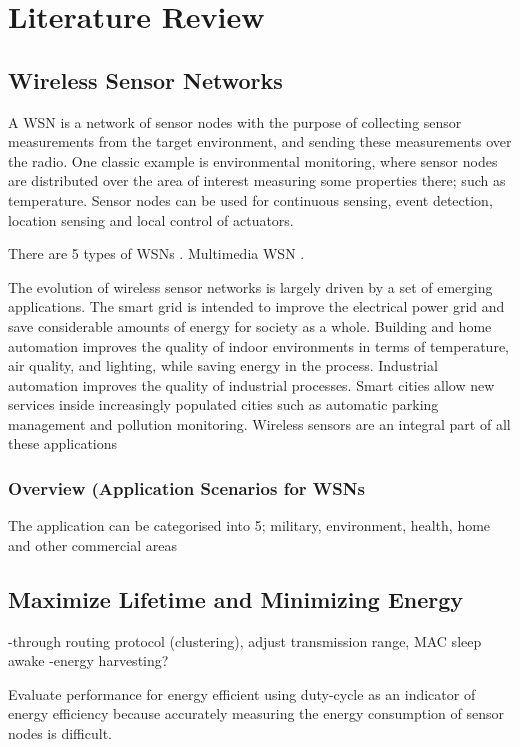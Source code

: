 \chapter{Literature Review}
\label{literatureReview}

\section{Wireless Sensor Networks}
A WSN is a network of sensor nodes with the purpose of collecting sensor measurements from the target environment, and sending these measurements over the radio. One classic example is environmental monitoring, where sensor nodes are distributed over the area of interest measuring some properties there; such as temperature.
Sensor nodes can be used for continuous sensing, event detection, location sensing and local control of actuators. 

There are 5 types of WSNs \cite{wsnSurvey1}.
Multimedia WSN \cite{wsnSurvey3}.

The evolution of wireless sensor networks is largely driven by a set of emerging applications. The smart grid is intended to improve the electrical power grid and save considerable amounts of energy for society as a whole. Building and home automation improves the quality of indoor environments in terms of temperature, air quality, and lighting, while saving energy in the process. Industrial automation improves the quality of industrial processes. Smart cities allow new services inside increasingly populated cities such as automatic parking management and pollution monitoring. Wireless sensors are an integral part of all these applications \cite{beyondInteroperability}

\subsection{Overview (Application Scenarios for WSNs}
The application can be categorised into 5; military, environment, health, home and other commercial areas \cite{wsnSurvey2}

\section{Maximize Lifetime and Minimizing Energy}
-through routing protocol (clustering), adjust transmission range, MAC sleep awake 
-energy harvesting?

Evaluate performance for energy efficient using duty-cycle as an indicator of energy efficiency because accurately measuring the energy consumption of sensor nodes is difficult. \cite{y-mac}

